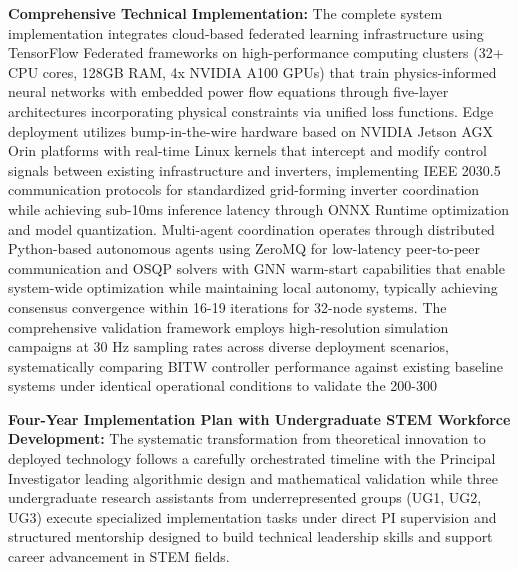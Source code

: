 \documentclass[12pt]{article}
\begin{document}
\textbf{Comprehensive Technical Implementation:} The complete system implementation integrates cloud-based federated learning infrastructure using TensorFlow Federated frameworks on high-performance computing clusters (32+ CPU cores, 128GB RAM, 4x NVIDIA A100 GPUs) that train physics-informed neural networks with embedded power flow equations through five-layer architectures incorporating physical constraints via unified loss functions. Edge deployment utilizes bump-in-the-wire hardware based on NVIDIA Jetson AGX Orin platforms with real-time Linux kernels that intercept and modify control signals between existing infrastructure and inverters, implementing IEEE 2030.5 communication protocols for standardized grid-forming inverter coordination while achieving sub-10ms inference latency through ONNX Runtime optimization and model quantization. Multi-agent coordination operates through distributed Python-based autonomous agents using ZeroMQ for low-latency peer-to-peer communication and OSQP solvers with GNN warm-start capabilities that enable system-wide optimization while maintaining local autonomy, typically achieving consensus convergence within 16-19 iterations for 32-node systems. The comprehensive validation framework employs high-resolution simulation campaigns at 30 Hz sampling rates across diverse deployment scenarios, systematically comparing BITW controller performance against existing baseline systems under identical operational conditions to validate the 200-300%

\textbf{Four-Year Implementation Plan with Undergraduate STEM Workforce Development:} The systematic transformation from theoretical innovation to deployed technology follows a carefully orchestrated timeline with the Principal Investigator leading algorithmic design and mathematical validation while three undergraduate research assistants from underrepresented groups (UG1, UG2, UG3) execute specialized implementation tasks under direct PI supervision and structured mentorship designed to build technical leadership skills and support career advancement in STEM fields.
\end{document}
